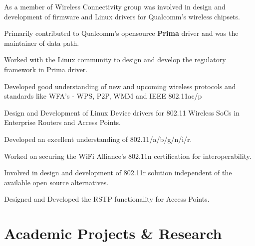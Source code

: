 \documentclass[letterpaper]{deedy-resume} %
\begin{document}
\begin{minipage}[t]{0.74\textwidth}
\begin{tightitemize}
\item As a member of Wireless Connectivity group was involved in design and development of firmware and Linux drivers for Qualcomm's wireless chipsets.
\item Primarily contributed to Qualcomm's opensource \textbf{Prima} driver and was the maintainer of data path.
\item Worked with the Linux community to design and develop the regulatory framework in Prima driver.
\item Developed good understanding of new and upcoming wireless protocols and standards like WFA's - WPS, P2P, WMM and IEEE 802.11ac/p
\end{tightitemize}

\sectionspace %



\begin{tightitemize}
\item Design and Development of Linux Device drivers for 802.11 Wireless SoCs in Enterprise Routers and Access Points.
\item Developed an excellent understanding of 802.11/a/b/g/n/i/r.
\item Worked on securing the WiFi Alliance's 802.11n certification for interoperability.
\item Involved in design and development of 802.11r solution independent of the available open source alternatives.
\item Designed and Developed the RSTP functionality for Access Points.
\end{tightitemize}

\sectionspace %


\section{Academic Projects \& Research}


\end{minipage}
\end{document}

